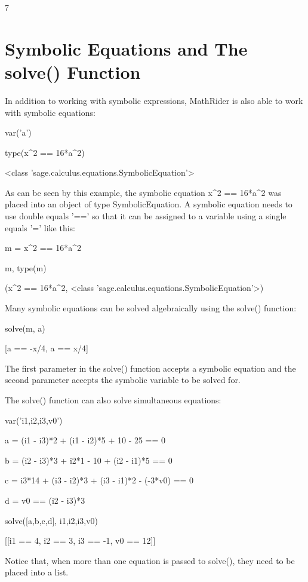 \documentclass[12pt,oneside]{book}
\begin{document}
7

\section[Symbolic Equations and The solve() Function]{Symbolic Equations and The solve() Function}

In addition to working with symbolic expressions, MathRider is also able to work with symbolic equations: 

var('a')

type(x\^{}2 == 16*a\^{}2)

{\textbar}

{\textless}class 'sage.calculus.equations.SymbolicEquation'{\textgreater}

As can be seen by this example, the symbolic equation x\^{}2 == 16*a\^{}2 was placed into an object of type SymbolicEquation. A symbolic equation needs to use double equals '==' so that it can be assigned to a variable using a single equals '=' like this: 

m = x\^{}2 == 16*a\^{}2

m, type(m)

{\textbar}

(x\^{}2 == 16*a\^{}2, {\textless}class 'sage.calculus.equations.SymbolicEquation'{\textgreater})

Many symbolic equations can be solved algebraically using the solve() function: 

solve(m, a)

{\textbar}

[a == {}-x/4, a == x/4]

The first parameter in the solve() function accepts a symbolic equation and the second parameter accepts the symbolic variable to be solved for. 

The solve() function can also solve simultaneous equations:


var('i1,i2,i3,v0')


a = (i1 {}- i3)*2 + (i1 {}- i2)*5 + 10 {}- 25 == 0

b = (i2 {}- i3)*3 + i2*1 {}- 10 + (i2 {}- i1)*5 == 0

c = i3*14 + (i3 {}- i2)*3 + (i3 {}- i1)*2 {}- ({}-3*v0) == 0

d = v0 == (i2 {}- i3)*3


solve([a,b,c,d], i1,i2,i3,v0)

{\textbar}

[[i1 == 4, i2 == 3, i3 == {}-1, v0 == 12]]

Notice that, when more than one equation is passed to solve(), they need to be placed into a list.
\end{document}
